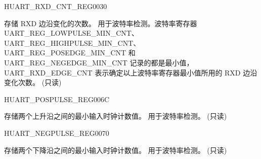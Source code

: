 \begin{register}{H}{UART\_RXD\_CNT\_REG}{\hexprefix{}0030}\label{regdesc:UARTRXDCNTREG}
%
%
\regnewline%
\begin{regdesc}\begin{reglist}
\label{fielddesc:UARTRXDEDGECNT}\item [UART\_RXD\_EDGE\_CNT] 存储 RXD 边沿变化的次数。 用于波特率检测。波特率寄存器 UART\_REG\_LOWPULSE\_MIN\_CNT、UART\_REG\_HIGHPULSE\_MIN\_CNT、UART\_REG\_POSEDGE\_MIN\_CNT 和 UART\_REG\_NEGEDGE\_MIN\_CNT 记录的都是最小值，UART\_RXD\_EDGE\_CNT 表示确定以上波特率寄存器最小值所用的 RXD 边沿变化次数。 (只读)
\end{reglist}\end{regdesc}
\end{register}


\begin{register}{H}{UART\_POSPULSE\_REG}{\hexprefix{}006C}\label{regdesc:UARTPOSPULSEREG}
%
%
\regnewline%
\begin{regdesc}\begin{reglist}
\label{fielddesc:UARTPOSEDGEMINCNT}\item [UART\_POSEDGE\_MIN\_CNT] 存储两个上升沿之间的最小输入时钟计数值。 用于波特率检测。 (只读)
\end{reglist}\end{regdesc}
\end{register}


\begin{register}{H}{UART\_NEGPULSE\_REG}{\hexprefix{}0070}\label{regdesc:UARTNEGPULSEREG}
%
%
\regnewline%
\begin{regdesc}\begin{reglist}
\label{fielddesc:UARTNEGEDGEMINCNT}\item [UART\_NEGEDGE\_MIN\_CNT] 存储两个下降沿之间的最小输入时钟计数值。 用于波特率检测。 (只读)
\end{reglist}\end{regdesc}
\end{register}


